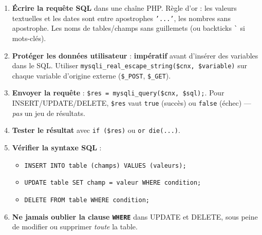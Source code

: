 \documentclass[11pt]{article}
\begin{document}
\begin{methode}
\begin{enumerate}
\item \textbf{Écrire la requête SQL} dans une chaîne PHP. Règle d'or : les valeurs textuelles et les dates sont entre apostrophes \texttt{'...'}, les nombres sans apostrophe. Les noms de tables/champs sans guillemets (ou backticks \texttt{\`} si mots-clés).
\item \textbf{Protéger les données utilisateur} : \textbf{impératif} avant d'insérer des variables dans le SQL. Utiliser \texttt{mysqli\_real\_escape\_string(\$cnx, \$variable)} sur chaque variable d'origine externe (\texttt{\$\_POST}, \texttt{\$\_GET}).
\item \textbf{Envoyer la requête} : \texttt{\$res = mysqli\_query(\$cnx, \$sql);}. Pour INSERT/UPDATE/DELETE, \texttt{\$res} vaut \texttt{true} (succès) ou \texttt{false} (échec) — \emph{pas} un jeu de résultats.
\item \textbf{Tester le résultat} avec \texttt{if (\$res)} ou \texttt{or die(...)}.
\item \textbf{Vérifier la syntaxe SQL} :
  \begin{itemize}
  \item \texttt{INSERT INTO table (champs) VALUES (valeurs);}
  \item \texttt{UPDATE table SET champ = valeur WHERE condition;}
  \item \texttt{DELETE FROM table WHERE condition;}
  \end{itemize}
\item \textbf{Ne jamais oublier la clause \texttt{WHERE}} dans UPDATE et DELETE, sous peine de modifier ou supprimer \emph{toute} la table.
\end{enumerate}
\end{methode}
\end{document}
